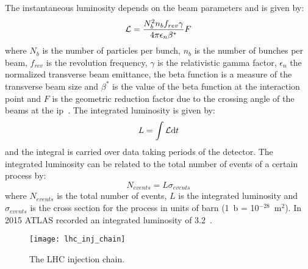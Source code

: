 The instantaneous luminosity depends on the beam parameters and is given by:
\begin{equation}
  \label{eq:54}
  \mathcal{L} = \frac{N^2_b n_b f_{rev} \gamma}{4 \pi \epsilon_n \beta^*} F
\end{equation}
where $N_b$ is the number of particles per bunch, $n_b$ is the number of bunches
per beam, $f_{rev}$ is the revolution frequency, $\gamma$ is the relativistic
gamma factor, $\epsilon_n$ the normalized transverse beam emittance, the beta
function is a measure of the transverse beam size and $\beta^*$ is the value of
the beta function at the interaction point and $F$ is the geometric reduction
factor due to the crossing angle of the beams at the \gls{ip}~\cite{LHC}. The
integrated luminosity is given by:
\begin{equation}
  \label{eq:55}
  L = \int \mathcal{L} \mathrm{d} t
\end{equation}
and the integral is carried over data taking periods of the detector. The
integrated luminosity can be related to the total number of events of a certain
process by:
\begin{equation}
  \label{eq:56}
  N_{events} = L \sigma_{events}
\end{equation}
where $N_{events}$ is the total number of events, $L$ is the integrated
luminosity and $\sigma_{events}$ is the cross section for the process in units
of barn (1~b = 10$^{-28}$~m$^2$). In 2015 ATLAS recorded an integrated
luminosity of 3.2~\ifb.

\begin{figure}[!h]
  \centering
    \texttt{[image: lhc\_inj\_chain]}
    \caption{The LHC injection chain.}
    \label{fig:lhc_inj_chain}
\end{figure}
